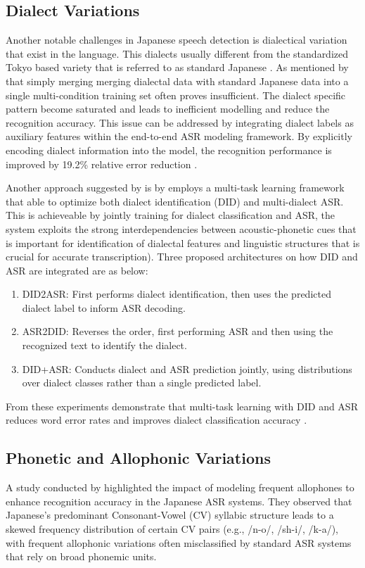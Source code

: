 \subsection{Dialect Variations}
Another notable challenges in Japanese speech detection is dialectical variation that exist in the language. This dialects usually different from the standardized Tokyo based variety that is referred to as standard Japanese \parencite{takahashi2024comparison}. As mentioned by \textcite{Imaizumi2020Dialect-Aware} that simply merging  merging dialectal data with standard Japanese data into a single multi-condition training set often proves insufficient. The dialect specific pattern become saturated and leads to inefficient modelling  and reduce the recognition accuracy. This issue can be addressed by integrating dialect labels as auxiliary features within the end-to-end ASR modeling framework. By explicitly encoding dialect information into the model, the recognition performance is improved by 19.2\% relative error reduction \parencite{Imaizumi2020Dialect-Aware}.

Another approach suggested by \textcite{imaizumi2022} is by employs a multi-task learning framework that able to optimize both dialect identification (DID) and multi-dialect ASR. This is achieveable by jointly training for dialect classification and ASR, the system exploits the strong interdependencies between acoustic-phonetic cues that is important for identification of dialectal features and linguistic structures that is crucial for accurate transcription). Three proposed architectures on how DID and ASR are integrated are as below:

\begin{enumerate}
    \item DID2ASR: First performs dialect identification, then uses the predicted dialect label to inform ASR decoding. 
    \item ASR2DID: Reverses the order, first performing ASR and then using the recognized text to identify the dialect. 
    \item DID+ASR: Conducts dialect and ASR prediction jointly, using distributions over dialect classes rather than a single predicted label.
\end{enumerate}

 
From these experiments demonstrate that multi-task learning with DID and ASR reduces word error rates and improves dialect classification accuracy \parencite{takahashi2024comparison}. 

\subsection{Phonetic and Allophonic Variations}
A study conducted by \textcite{Nguyen2002ModelingFA} highlighted the impact of modeling frequent allophones to enhance recognition accuracy in the Japanese ASR systems. They observed that Japanese's predominant Consonant-Vowel (CV) syllabic structure leads to a skewed frequency distribution of certain CV pairs (e.g., /n-o/, /sh-i/, /k-a/), with frequent allophonic variations often misclassified by standard ASR systems that rely on broad phonemic units. 

